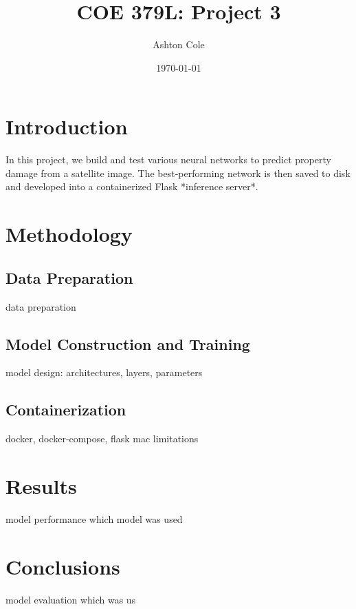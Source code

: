 \documentclass{article}
\title{COE 379L: Project 3}
\author{Ashton Cole}
\date{\today}
\begin{document}
\maketitle

\section{Introduction}

In this project, we build and test various neural networks to predict property damage from a satellite image. The best-performing network is then saved to disk and developed into a containerized Flask *inference server*.

\section{Methodology}

\subsection{Data Preparation}
data preparation

\subsection{Model Construction and Training}
model design: architectures, layers, parameters

\subsection{Containerization}
docker, docker-compose, flask
mac limitations

\section{Results}

model performance
which model was used

\section{Conclusions}

model evaluation
which was us
\end{document}

